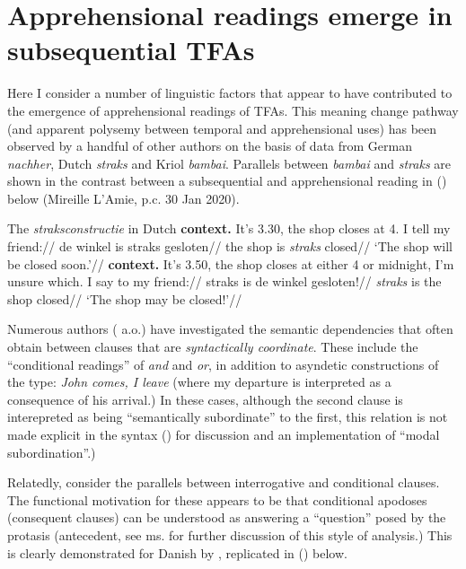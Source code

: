 \documentclass[11pt]{article}
\begin{document}
\section{Apprehensional readings emerge in subsequential TFAs}\label{diaS}


 Here I consider a number of linguistic factors that appear to have contributed to the emergence of apprehensional readings of TFAs. This meaning change pathway (and apparent polysemy between temporal and apprehensional uses) has been observed by a handful of other authors \citep{Angelo2016,Angelo2018,Boogaart2020} on the basis of data from German \textit{nachher}, Dutch \textit{straks} and Kriol \textit{bambai}. Parallels between \textit{bambai} and \textit{straks} are shown in the contrast between a subsequential and apprehensional reading in () below (Mireille L'Amie, p.c. 30 Jan 2020).
 
 \pex The \textit{straksconstructie} in Dutch \citep[see also][]{Boogaart2020}
 \a\begingl\glpreamble\textbf{context.} It's 3.30, the shop closes at 4. I tell my friend://
 \gla de winkel is straks gesloten//
\glb the shop is \textit{straks} closed//
\glft `The shop will be closed soon.'//\endgl
\a\begingl\glpreamble\textbf{context.} It's 3.50, the shop closes at either 4 or midnight, I'm unsure which. I say to my friend://
\gla straks is de winkel gesloten!//
\glb \textit{straks} is the shop closed//
\glft`The shop may be closed!'//\endgl\xe
 


Numerous authors (\citealp[e.g.][]{Stukker2012,Schmerling1975,Harder1995,Culicover1997,Klinedinst2012} a.o.) have investigated the semantic dependencies that often obtain between clauses that are \textit{syntactically coordinate}. These include the ``conditional readings'' of \textit{and} and \textit{or}, in addition to asyndetic constructions of the type: \textit{John comes, I leave} (where my departure is interpreted as a consequence of his arrival.) In these cases, although the second clause is interepreted as being ``semantically subordinate'' to the first, this relation is not made explicit in the syntax (\citealp[see][]{Roberts1989}) for discussion and an implementation of ``modal subordination''.)

Relatedly, consider the parallels between interrogative and conditional clauses. The functional motivation for these appears to be that conditional apodoses (consequent clauses) can be understood as answering a ``question'' posed by the protasis (antecedent, see \citealp{PhilKotek} ms. for further discussion of this style of analysis.) This is clearly demonstrated for Danish by \citet[101-2]{Harder1995}, replicated in () below.
\end{document}
